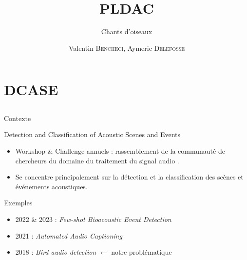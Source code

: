 \documentclass[compress,xcolor=table]{beamer}
\title{PLDAC}
\subtitle{Chants d'oiseaux} %
\date{\formatdate{25}{05}{2023}}
\author{Valentin \textsc{Bencheci}, Aymeric \textsc{Delefosse}}
\institute{Master DAC - Sorbonne Université} %
\begin{document}
\begin{frame}[plain]
    \titlepage
    \setcounter{framenumber}{0}
\end{frame}


\section{DCASE} \subsection{}

\begin{frame}{Contexte}

    \begin{block}{Detection and Classification of Acoustic Scenes and Events}

        \begin{itemize}
            \item
                  Workshop \& Challenge annuels : rassemblement de la communauté de chercheurs du domaine du traitement du signal audio .
            \item
                  Se concentre principalement sur la détection et la classification des scènes et événements acoustiques.
        \end{itemize}

    \end{block}

    \begin{exampleblock}{Exemples}
        \begin{itemize}
            \item
                  2022 \& 2023 : \textit{Few-shot Bioacoustic Event Detection}
            \item
                  2021 : \textit{Automated Audio Captioning}
            \item
                  2018 : \textit{Bird audio detection} $\leftarrow$ notre problématique
        \end{itemize}
    \end{exampleblock}

\end{frame}
\end{document}
